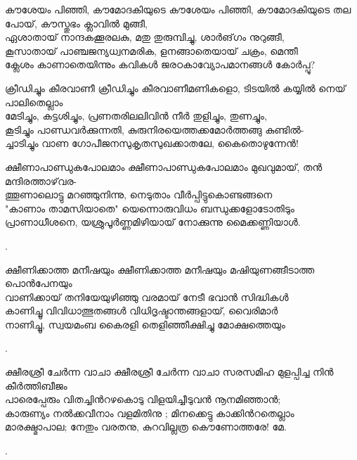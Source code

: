 \begin{enumerate}

\begin{slokam}{\VSr}{\AR}{കൗശേയം പിഞ്ഞി, കൗമോദകിയുടെ}
കൗശേയം പിഞ്ഞി, കൗമോദകിയുടെ തല പോയ്, കൗസ്തുഭം ക്ലാവിൽ മുങ്ങീ,\\
ഏശാതായ് നാന്ദകക്കൂരലകു, മതു തുരുമ്പിച്ചു, ശാർങ്‌ഗം നുറുങ്ങീ,\\
കൂസാതായ് പാഞ്ചജന്യധ്വനമരിക, ളനങ്ങാതെയായ് ചക്രം, മെന്തീ \\
ക്ലേശം കാണാതെയിന്നും കവികൾ ജരഠകാവ്യോപമാനങ്ങൾ കോർപ്പൂ? 
\end{slokam}



\begin{slokam}{\VSr}{\VenM}{ക്രീഡിച്ചും കീരവാണീ}
ക്രീഡിച്ചും കീരവാണീമണികളൊ, ടിടയിൽ കയ്യിൽ നെയ്‌ പാലിതെല്ലാം\\
മേടിച്ചും, കട്ടശിച്ചും, പ്രണതരിലലിവിൻ നീർ തുളിച്ചും, തുണച്ചും,\\
കൂടിച്ചും പാണ്ഡവർക്കുന്നതി, കുരുനിരയെത്തക്കമോർത്തങ്ങു കുണ്ടിൽ-\\
ച്ചാടിച്ചും വാണ ഗോപീജനസുകൃതസുഖക്കാതലേ, കൈതൊഴുന്നേൻ!
\end{slokam}


\begin{slokam}{\VSv}{\VNM}{ക്ഷീണാപാണ്ഡുകപോലമാം}
ക്ഷീണാപാണ്ഡുകപോലമാം മുഖവുമായ്‌, തൻ മന്ദിരത്താഴ്‌വര-\\
ത്തൂണാലൊട്ടു മറഞ്ഞുനിന്നു, നെടുതാം വീർപ്പിട്ടുകൊണ്ടങ്ങനെ\\
"കാണാം താമസിയാതെ" യെന്നൊരുവിധം ബന്ധുക്കളോടോതിടും\\
പ്രാണാധീശനെ, യശ്രുപൂർണ്ണമിഴിയായ്‌ നോക്കുന്നു മൈക്കണ്ണിയാള്‍.
\end{slokam}


.



\begin{slokam}{\VSv}{\KA}{ക്ഷീണിക്കാത്ത മനീഷയും}
ക്ഷീണിക്കാത്ത മനീഷയും മഷിയുണങ്ങീടാത്ത പൊൻപേനയും\\
വാണിക്കായ്‌ തനിയേയുഴിഞ്ഞു വരമായ്‌ നേടീ ഭവാൻ സിദ്ധികള്‍\\
കാണിച്ചൂ വിവിധാത്ഭുതങ്ങള്‍ വിധിദൃഷ്ടാന്തങ്ങളായ്‌, വൈരിമാർ\\
നാണിച്ചൂ, സ്വയമംബ കൈരളി തെളിഞ്ഞീക്ഷിച്ചു മോക്ഷത്തെയും
\end{slokam}


.

\begin{slokam}{\VSr}{\Unk}{ക്ഷീരശ്രീ ചേർന്ന വാചാ}
ക്ഷീരശ്രീ ചേർന്ന വാചാ സരസമിഹ മുളപ്പിച്ച നിൻ കീർത്തിബീജം\\
പാരെപ്പേരും വിതച്ചിൻറഴകൊടു വിളയിച്ചീടുവൻ നൂനമിഞ്ഞാൻ;\\
കാരുണ്യം നൽക്കവീനാം വളമിതിനു ; മിനക്കെട്ടു കാക്കിൻറതെല്ലാം\\
മാരക്ഷ്മാപാല; നേതും വരതനു, കുറവില്ലത്ര കൌണോത്തരേ! മേ.
\end{slokam}


.

\end{enumerate}

